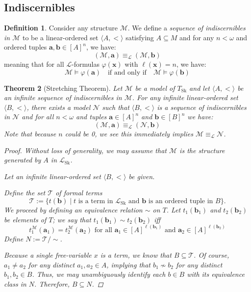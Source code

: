 \documentclass{amsart}
\newtheorem{theorem}{Theorem}[section]
\theoremstyle{definition}
\newtheorem{definition}[theorem]{Definition}
\numberwithin{equation}{theorem}
\renewcommand{\phi}{\varphi}
\newcommand{\V}{\mathbf}
\newcommand{\where}{\mid}
\newcommand{\len}{\ell}
\newcommand{\Tskolem}{{T_\text{Sk}}}
\newcommand{\frag}{\mathcal{L}}
\newcommand{\fragsk}{\frag_{\text{Sk}}}
\begin{document}
\subsection{Indiscernibles}
\begin{definition}
  Consider any structure $\mathcal M$.
  We define a \emph{sequence of indiscernibles in $\mathcal M$} to be a linear-ordered set $\langle A,<\rangle$ satisfying $A\subseteq M$ and for any $n<\omega$ and ordered tuples $\V a,\V b\in[A]^n$, we have:
  \[
    (\mathcal M,\V a)\equiv_\frag (\mathcal M,\V b)
  \]
  meaning that for all $\frag$-formulas $\phi(\V x)$ with $\len(\V x)=n$, we have:
  \[
    \mathcal M\models\phi(\V a)\quad\text{if and only if}\quad\mathcal M\models\phi(\V b)
  \]
\end{definition}

\begin{theorem}[Stretching Theorem]\label{thm:stretching}
  Let $\mathcal M$ be a model of $\Tskolem$ and let $\langle A,<\rangle$ be an infinite sequence of indiscernibles in $\mathcal M$.
  For any infinite linear-ordered set $\langle B,<\rangle$, there exists a model $\mathcal N$ such that $\langle B,<\rangle$ is a sequence of indiscernibles in $\mathcal N$ and for all $n<\omega$ and tuples $\V a\in[A]^n$ and $\V b\in[B]^n$ we have:
  \[
    (\mathcal M,\V a)\equiv_\frag (\mathcal N,\V b)
  \]
  Note that because $n$ could be 0, we see this immediately implies $\mathcal M\equiv_\frag\mathcal N$.
  \begin{proof}
    Without loss of generality, we may assume that $\mathcal M$ is the structure generated by $A$ in $\fragsk$.
    
    Let an infinite linear-ordered set $\langle B,<\rangle$ be given.
    
    Define the set $\mathcal T$ of formal terms
    \[
      \mathcal T:=\{t(\V b)\where \text{$t$ is a term in $\fragsk$ and $\V b$ is an ordered tuple in $B$}\}.
    \]
    We proceed by defining an equivalence relation $\sim$ on $T$.
    Let $t_1(\V b_1)$ and $t_2(\V b_2)$ be elements of $T$; we say that $t_1(\V b_1)\sim t_2(\V b_2)$ iff 
    \[
      t_1^\mathcal M(\V a_1)=t_2^\mathcal M(\V a_2)\text{ for all $\V a_1\in[A]^{\len(\V b_1)}$ and $\V a_2\in[A]^{\len(\V b_2)}$}
    \]
    Define $N:=\mathcal T/{\sim}$.
    
    Because a single free-variable $x$ is a term, we know that $B\subseteq \mathcal T$.
    Of course, $a_1\neq a_2$ for any distinct $a_1,a_2\in A$, implying that $b_1\not\sim b_2$ for any distinct $b_1,b_2\in B$.
    Thus, we may unambiguously identify each $b\in B$ with its equivalence class in $N$.
    Therefore, $B\subseteq N$.
    

\end{proof}
\end{theorem}
\end{document}

